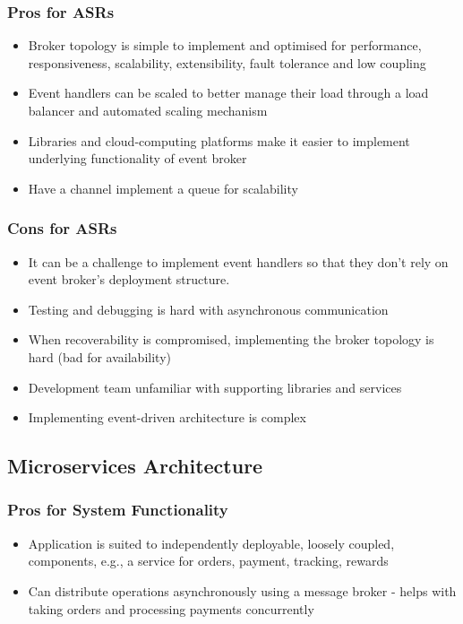 \documentclass{article}
\begin{document}
\subsubsection*{Pros for ASRs}
\begin{itemize}
    \item Broker topology is simple to implement and optimised for performance, responsiveness, scalability, extensibility, fault tolerance and low coupling
    \item Event handlers can be scaled to better manage their load through a load balancer and automated scaling mechanism
    \item Libraries and cloud-computing platforms make it easier to implement underlying functionality of event broker
    \item Have a channel implement a queue for scalability
\end{itemize}
\subsubsection*{Cons for ASRs}
\begin{itemize}
    \item It can be a challenge to implement event handlers so that they don't rely on event broker's deployment structure.
    \item Testing and debugging is hard with asynchronous communication
    \item When recoverability is compromised, implementing the broker topology is hard (bad for availability)
    \item Development team unfamiliar with supporting libraries and services
    \item Implementing event-driven architecture is complex
\end{itemize}

\subsection{Microservices Architecture}
\subsubsection*{Pros for System Functionality}
\begin{itemize}
    \item Application is suited to independently deployable, loosely coupled, components, e.g., a service for orders, payment, tracking, rewards
    \item Can distribute operations asynchronously using a message broker - helps with taking orders and processing payments concurrently
\end{itemize}   
\end{document}
